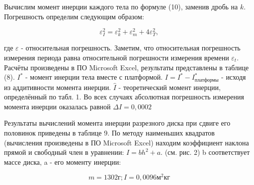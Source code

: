 \documentclass{report}
\begin{document}
	
	
	
	Вычислим момент инерции каждого тела по формуле (10), заменив дробь на $k$. Погрешность определим следующим образом:
	
	\begin{equation}
		\varepsilon_{I}^{2} = \varepsilon_{k}^{2} + \varepsilon_{m}^{2} + 4\varepsilon_{T}^{2},
	\end{equation}
	
	где $\varepsilon$  - относительная погрешность. Заметим, что относительная погрешность измерения периода равна относительной погрешности измерения времени $\varepsilon_{t}$. Расчёты произведены в ПО Microsoft Excel, результаты представлены в таблице (8). $I^{*}$ - момент инерции тела вместе с платформой. $I = I^{*} - I_{платформы}^{*}$ - исходя из аддитивности момента инерции. $\hat{I}$ - теоретический момент инерции, определённый по табл. 1. Во всех случаях абсолютная погрешность измерения момента инерции оказалась равной 
	$\Delta I = 0,0002$
	
	Результаты вычислений момента инерции разрезного диска при сдвиге его половинок приведены в таблице 9. По методу наименьших квадратов (вычисления произведены в ПО Microsoft Excel) находим коэффициент наклона прямой и свободный член в уравнении: $I = bh^{2} + a$. (см. рис. 2) b соответствует массе диска, a - его моменту инерции:
	
	\begin{equation}
		\boxed {m = 1302 г;
		I = 0,0096 м^{2}кг}
	\end{equation}
	

	\begin{table}[!h]
		\centering
	\end{table}
	
\end{document}
